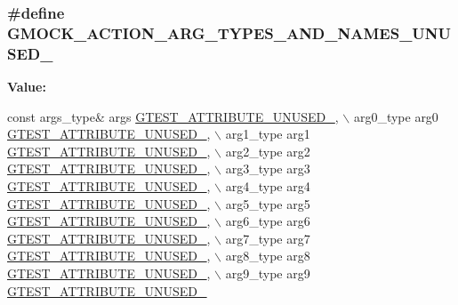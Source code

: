 \subsubsection[{\texorpdfstring{G\+M\+O\+C\+K\+\_\+\+A\+C\+T\+I\+O\+N\+\_\+\+A\+R\+G\+\_\+\+T\+Y\+P\+E\+S\+\_\+\+A\+N\+D\+\_\+\+N\+A\+M\+E\+S\+\_\+\+U\+N\+U\+S\+E\+D\+\_\+}{GMOCK_ACTION_ARG_TYPES_AND_NAMES_UNUSED_}}]{\setlength{\rightskip}{0pt plus 5cm}\#define G\+M\+O\+C\+K\+\_\+\+A\+C\+T\+I\+O\+N\+\_\+\+A\+R\+G\+\_\+\+T\+Y\+P\+E\+S\+\_\+\+A\+N\+D\+\_\+\+N\+A\+M\+E\+S\+\_\+\+U\+N\+U\+S\+E\+D\+\_\+}\hypertarget{gmock-generated-actions_8h_a069f37fdbe36aabe65da6eb6221b9b19}{}\label{gmock-generated-actions_8h_a069f37fdbe36aabe65da6eb6221b9b19}
{\bfseries Value\+:}
\begin{DoxyCode}
\textcolor{keyword}{const} args\_type& args \hyperlink{gtest-port_8h_a01f3b31960fc7c4c7ee4b398a914f89a}{GTEST\_ATTRIBUTE\_UNUSED\_}, \(\backslash\)
    arg0\_type arg0 \hyperlink{gtest-port_8h_a01f3b31960fc7c4c7ee4b398a914f89a}{GTEST\_ATTRIBUTE\_UNUSED\_}, \(\backslash\)
    arg1\_type arg1 \hyperlink{gtest-port_8h_a01f3b31960fc7c4c7ee4b398a914f89a}{GTEST\_ATTRIBUTE\_UNUSED\_}, \(\backslash\)
    arg2\_type arg2 \hyperlink{gtest-port_8h_a01f3b31960fc7c4c7ee4b398a914f89a}{GTEST\_ATTRIBUTE\_UNUSED\_}, \(\backslash\)
    arg3\_type arg3 \hyperlink{gtest-port_8h_a01f3b31960fc7c4c7ee4b398a914f89a}{GTEST\_ATTRIBUTE\_UNUSED\_}, \(\backslash\)
    arg4\_type arg4 \hyperlink{gtest-port_8h_a01f3b31960fc7c4c7ee4b398a914f89a}{GTEST\_ATTRIBUTE\_UNUSED\_}, \(\backslash\)
    arg5\_type arg5 \hyperlink{gtest-port_8h_a01f3b31960fc7c4c7ee4b398a914f89a}{GTEST\_ATTRIBUTE\_UNUSED\_}, \(\backslash\)
    arg6\_type arg6 \hyperlink{gtest-port_8h_a01f3b31960fc7c4c7ee4b398a914f89a}{GTEST\_ATTRIBUTE\_UNUSED\_}, \(\backslash\)
    arg7\_type arg7 \hyperlink{gtest-port_8h_a01f3b31960fc7c4c7ee4b398a914f89a}{GTEST\_ATTRIBUTE\_UNUSED\_}, \(\backslash\)
    arg8\_type arg8 \hyperlink{gtest-port_8h_a01f3b31960fc7c4c7ee4b398a914f89a}{GTEST\_ATTRIBUTE\_UNUSED\_}, \(\backslash\)
    arg9\_type arg9 \hyperlink{gtest-port_8h_a01f3b31960fc7c4c7ee4b398a914f89a}{GTEST\_ATTRIBUTE\_UNUSED\_}
\end{DoxyCode}

